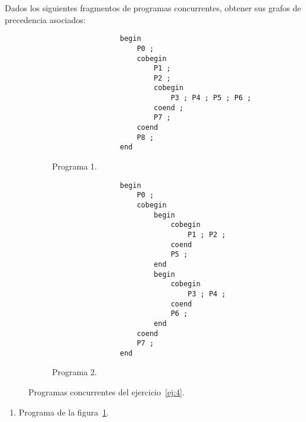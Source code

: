 \begin{ejercicio} \label{ej:4}
    Dados los siguientes fragmentos de programas concurrentes, obtener sus grafos de precedencia asociados:
    \begin{figure}[H]
        \centering
        \begin{subfigure}[b]{0.45\textwidth}
            \centering
            \begin{verbatim}
                begin
                    P0 ;
                    cobegin
                        P1 ;
                        P2 ;
                        cobegin
                            P3 ; P4 ; P5 ; P6 ;
                        coend ;
                        P7 ;
                    coend
                    P8 ;
                end
            \end{verbatim}
            \caption{Programa 1.}
            \label{code:prog1_Ej4}
        \end{subfigure}\hfill
        \begin{subfigure}[b]{0.45\textwidth}
            \centering
            \begin{verbatim}
                begin
                    P0 ;
                    cobegin
                        begin
                            cobegin
                                P1 ; P2 ;
                            coend
                            P5 ;
                        end
                        begin
                            cobegin
                                P3 ; P4 ;
                            coend
                            P6 ;
                        end
                    coend
                    P7 ;
                end
            \end{verbatim}
            \caption{Programa 2.}
            \label{code:prog2_Ej4}
        \end{subfigure}
        \caption{Programas concurrentes del ejercicio~\ref{ej:4}.}
    \end{figure}
    
    \begin{enumerate}
        \item Programa de la figura~\ref{code:prog1_Ej4}.

            \begin{figure}[H]
            \centering
\end{figure}
\end{enumerate}
\end{ejercicio}
